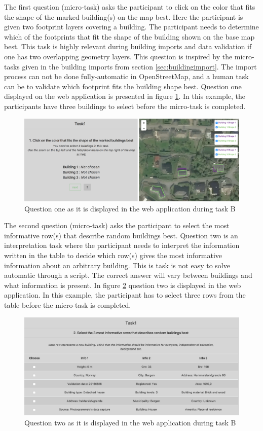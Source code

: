 The first question (micro-task) asks the participant to click on the color that fits the shape of the marked building(s) on the map best. Here the participant is given two footprint layers covering a building. The participant needs to determine which of the footprints that fit the shape of the building shown on the base map best. This task is highly relevant during building imports and data validation if one has two overlapping geometry layers. This question is inspired by the micro-tasks given in the building imports from section \ref{sec:buildingimport}. The import process can not be done fully-automatic in OpenStreetMap, and a human task can be to validate which footprint fits the building shape best. Question one displayed on the web application is presented in figure \ref{fig:q12}. In this example, the participants have three buildings to select before the micro-task is completed. 

\begin{figure}[H]
	\centering
	\includegraphics[width=0.8\linewidth]{fig/q1_2}
	\caption{Question one as it is displayed in the web application during task B}
	\label{fig:q12}
\end{figure}

The second question (micro-task) asks the participant to select the most informative row(s) that describe random buildings best. Question two is an interpretation task where the participant needs to interpret the information written in the table to decide which row(s) gives the most informative information about an arbitrary building. This is task is not easy to solve automatic through a script. The correct answer will vary between buildings and what information is present. In figure \ref{fig:q22} question two is displayed in the web application. In this example, the participant has to select three rows from the table before the micro-task is completed. 

\begin{figure}[H]
	\centering
	\includegraphics[width=0.8\linewidth]{fig/q2_2}
	\caption{Question two as it is displayed in the web application during task B}
	\label{fig:q22}
\end{figure}

